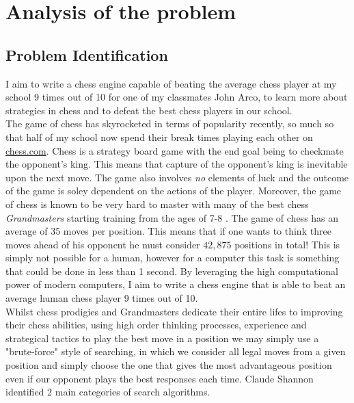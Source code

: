 \pagestyle{fancy}

\chapter{Analysis of the problem}

\section{Problem Identification}
I aim to write a chess engine capable of beating the 
average chess player at my school 9 times out of 10 for 
one of my classmates John Arco, to learn more about 
strategies in chess and to defeat the best chess players 
in our school.\\

The game of chess has skyrocketed in terms of popularity
recently, so much so that half of my school now spend their
break times playing each other on \url{chess.com}. Chess 
is a strategy board game with the end goal being to checkmate
the opponent's king. \cite{rules} This means that capture of 
the opponent's king is inevitable upon the next move. The 
game also involves \textit{no} elements of luck and the 
outcome of the game is soley dependent on the actions of the
player. Moreover, the game of chess is known to be very
hard to master with many of the best chess
\textit{Grandmasters} starting training from the
ages of 7-8 \cite{Magnus}. The game of chess has an average
of 35 moves \cite{branch} per position. This means that 
if one wants to think three moves ahead of his opponent
he must consider $42,875$ positions in total! This is
simply not possible for a human, however for a computer
this task is something that could be done in less than
1 second. By leveraging the high computational power
of modern computers, I aim to write a chess engine that
is able to beat an average human chess player 9 times
out of 10.\\

Whilst chess prodigies and Grandmasters dedicate their entire
lifes to improving their chess abilities, using high order 
thinking processes, experience and strategical tactics to play
the best move in a position we may simply use a "brute-force" 
style of searching, in which we consider all legal moves from a 
given position and simply choose the one that gives the most
advantageous position even if our opponent plays the best 
responses each time. Claude Shannon \cite{shan} identified 2 main
categories of search algorithms. \cite{search} 

